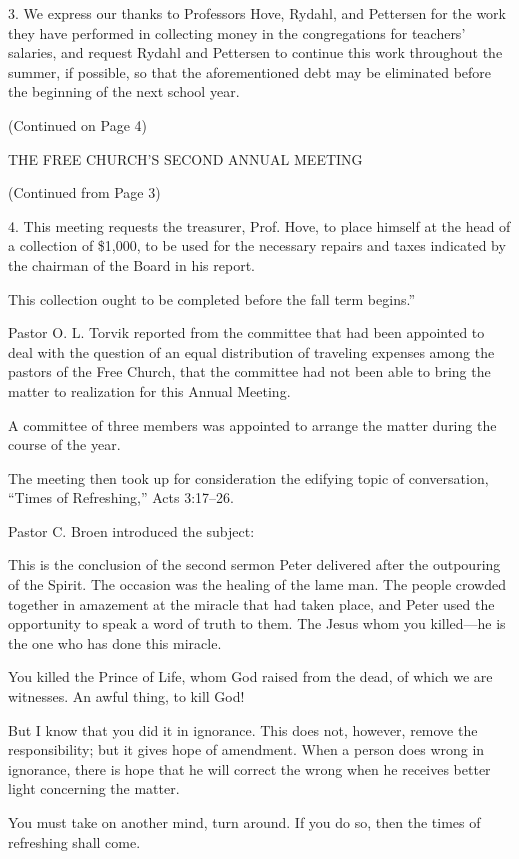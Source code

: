 3. We express our thanks to Professors Hove, Rydahl, and Pettersen for the work they have performed in collecting money in the congregations for teachers’ salaries, and request Rydahl and Pettersen to continue this work throughout the summer, if possible, so that the aforementioned debt may be eliminated before the beginning of the next school year.

(Continued on Page 4)

THE FREE CHURCH’S SECOND ANNUAL MEETING

(Continued from Page 3)

4. This meeting requests the treasurer, Prof. Hove, to place himself at the head of a collection of \$1,000, to be used for the necessary repairs and taxes indicated by the chairman of the Board in his report.

This collection ought to be completed before the fall term begins.”

Pastor O. L. Torvik reported from the committee that had been appointed to deal with the question of an equal distribution of traveling expenses among the pastors of the Free Church, that the committee had not been able to bring the matter to realization for this Annual Meeting.

A committee of three members was appointed to arrange the matter during the course of the year.

The meeting then took up for consideration the edifying topic of conversation, “Times of Refreshing,” Acts 3:17–26.

Pastor C. Broen introduced the subject:

This is the conclusion of the second sermon Peter delivered after the outpouring of the Spirit. The occasion was the healing of the lame man. The people crowded together in amazement at the miracle that had taken place, and Peter used the opportunity to speak a word of truth to them. The Jesus whom you killed—he is the one who has done this miracle.

You killed the Prince of Life, whom God raised from the dead, of which we are witnesses. An awful thing, to kill God!

But I know that you did it in ignorance. This does not, however, remove the responsibility; but it gives hope of amendment. When a person does wrong in ignorance, there is hope that he will correct the wrong when he receives better light concerning the matter.

You must take on another mind, turn around. If you do so, then the times of refreshing shall come.

